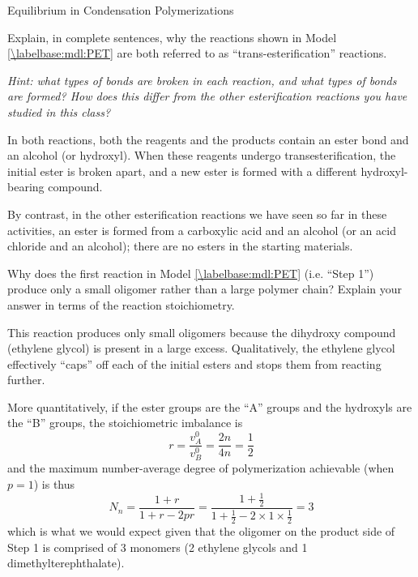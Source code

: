 \begin{activity}{Equilibrium in Condensation Polymerizations}
\begin{exercises}
		\exercise Explain, in complete sentences, why the reactions shown in Model \ref{\labelbase:mdl:PET} are both referred to as ``trans-esterification'' reactions.
		
			\emph{Hint: what types of bonds are broken in each reaction, and what types of bonds are formed?  How does this differ from the other esterification reactions you have studied in this class?}
			
			\begin{solution}{}
				In both reactions, both the reagents and the products contain an ester bond and an alcohol (or hydroxyl).  When these reagents undergo transesterification, the initial ester is broken apart, and a new ester is formed with a different hydroxyl-bearing compound.
				
				By contrast, in the other esterification reactions we have seen so far in these activities, an ester is formed from a carboxylic acid and an alcohol (or an acid chloride and an alcohol); there are no esters in the starting materials.
				
			\end{solution}
		
		\exercise Why does the first reaction in Model \ref{\labelbase:mdl:PET} (i.e. ``Step 1'') produce only a small oligomer rather than a large polymer chain?  Explain your answer in terms of the reaction stoichiometry.
		
			\begin{solution}{}
				This reaction produces only small oligomers because the dihydroxy compound (ethylene glycol) is present in a large excess.  Qualitatively, the ethylene glycol effectively ``caps'' off each of the initial esters and stops them from reacting further.
				
				More quantitatively, if the ester groups are the ``A'' groups and the hydroxyls are the ``B'' groups, the stoichiometric imbalance is
				\begin{equation*}
					r=  \frac{v_A^0}{v_B^0} = \frac{2n}{4n} = \frac{1}{2}
				\end{equation*}
				and the maximum number-average degree of polymerization achievable (when $p=1$) is thus
				\begin{equation*}
					N_n = \frac{1+r}{1+r-2pr} = \frac{1 + \frac{1}{2}}{1 + \frac{1}{2} - 2\times1\times\frac{1}{2}} = 3
				\end{equation*}
				which is what we would expect given that the oligomer on the product side of Step 1 is comprised of 3 monomers (2 ethylene glycols and 1 dimethylterephthalate).
				

\end{solution}
\end{exercises}
\end{activity}
